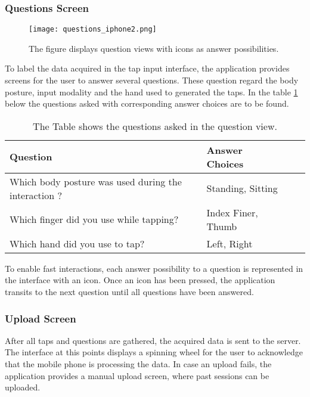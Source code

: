\subsubsection{Questions Screen}
\begin{figure}[h!]
  \centering
  \texttt{[image: questions\_iphone2.png]}
  \caption{The figure displays question views with icons as answer possibilities.}
\end{figure}

To label the data acquired in the tap input interface, the application provides screens for the user to answer several questions. These question regard the body posture, input modality and the hand used to generated the taps. In the table \ref{table:questions} below the questions asked with corresponding answer choices are to be found.


\begin{table}
  \centering
  \begin{tabular}{| l | l | l | l |}
  \hline
  \textbf{Question} & \textbf{Answer Choices} \\ \hline
  Which body posture was used during the interaction ? & Standing, Sitting \\
  Which finger did you use while tapping? & Index Finer, Thumb \\
  Which hand did you use to tap? & Left, Right \\
  \hline
  \end{tabular}
  \caption{The Table shows the questions asked in the question view.}\label{table:questions}
\end{table}

To enable fast interactions, each answer possibility to a question is represented in the interface with an icon. Once an icon has been pressed, the application transits to the next question until all questions have been answered.

\subsubsection{Upload Screen}
After all taps and questions are gathered, the acquired data is sent to the server. The interface at this points displays a spinning wheel for the user to acknowledge that the mobile phone is processing the data. In case an upload fails, the application provides a manual upload screen, where past sessions can be uploaded.

